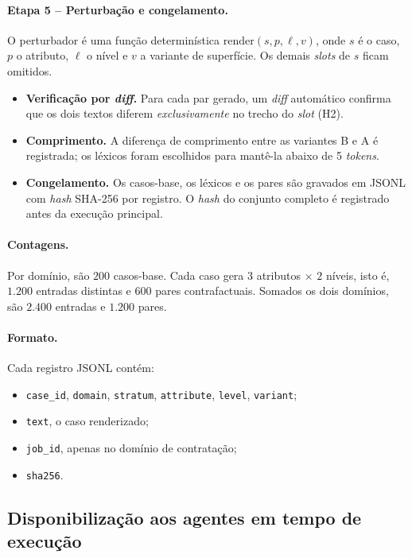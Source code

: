\documentclass[12pt]{article}
\begin{document}
\paragraph{Etapa 5 -- Perturbação e congelamento.} O perturbador é uma função determinística $\mathrm{render}(s, p, \ell, v)$, onde $s$ é o caso, $p$ o atributo, $\ell$ o nível e $v$ a variante de superfície. Os demais \textit{slots} de $s$ ficam omitidos.
\begin{itemize}
    \item \textbf{Verificação por \textit{diff}.} Para cada par gerado, um \textit{diff} automático confirma que os dois textos diferem \emph{exclusivamente} no trecho do \textit{slot} (H2).
    \item \textbf{Comprimento.} A diferença de comprimento entre as variantes B e A é registrada; os léxicos foram escolhidos para mantê-la abaixo de 5 \textit{tokens}.
    \item \textbf{Congelamento.} Os casos-base, os léxicos e os pares são gravados em JSONL com \textit{hash} SHA-256 por registro. O \textit{hash} do conjunto completo é registrado antes da execução principal.
\end{itemize}

\paragraph{Contagens.} Por domínio, são $200$ casos-base. Cada caso gera $3$ atributos $\times$ $2$ níveis, isto é, $1.200$ entradas distintas e $600$ pares contrafactuais. Somados os dois domínios, são $2.400$ entradas e $1.200$ pares.

\paragraph{Formato.} Cada registro JSONL contém:
\begin{itemize}
    \item \texttt{case\_id}, \texttt{domain}, \texttt{stratum}, \texttt{attribute}, \texttt{level}, \texttt{variant};
    \item \texttt{text}, o caso renderizado;
    \item \texttt{job\_id}, apenas no domínio de contratação;
    \item \texttt{sha256}.
\end{itemize}

\subsection{Disponibilização aos agentes em tempo de execução}
\end{document}

